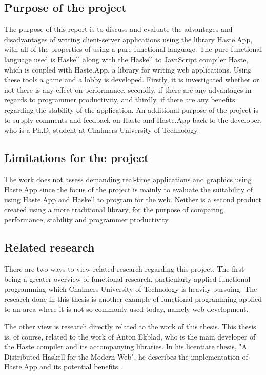\documentclass[a4paper]{article}
\begin{document}
\subsection{Purpose of the project}
\label{sec:purpose}
The purpose of this report is to discuss and evaluate the advantages and disadvantages of writing client-server applications using the library Haste.App, with all of the properties of using a pure functional language. The pure functional language used is Haskell along with the Haskell to JavaScript compiler Haste, which is coupled with Haste.App, a library for writing web applications. Using these tools a game and a lobby is developed. Firstly, it is investigated whether or not there is any effect on performance, secondly, if there are any advantages in regards to programmer productivity, and thirdly, if there are any benefits regarding the stability of the application. An additional purpose of the project is to supply comments and feedback on Haste and Haste.App back to the developer, who is a Ph.D. student at Chalmers University of Technology.

\subsection{Limitations for the project}
\label{sec:limitations}
The work does not assess demanding real-time applications and graphics using Haste.App since the focus of the project is mainly to evaluate the suitability of using Haste.App and Haskell to program for the web. Neither is a second product created using a more traditional library, for the purpose of comparing performance, stability and programmer productivity.


\subsection{Related research}
There are two ways to view related research regarding this project. The first being a greater overview of functional research, particularly applied functional programming which Chalmers University of Technology is heavily pursuing. The research done in this thesis is another example of functional programming applied to an area where it is not so commonly used today, namely web development.

The other view is research directly related to the work of this thesis. This thesis is, of course, related to the work of Anton Ekblad, who is the main developer of the Haste compiler and its accompanying libraries. In his licentiate thesis, "A Distributed Haskell for the Modern Web", he describes the implementation of Haste.App and its potential benefits \cite{a-distributed-haskell-for-the-modern-web}.
\end{document}
